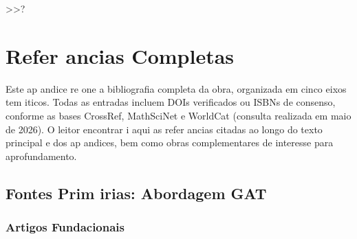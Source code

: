  >>?\chapter{Refer ancias Completas}
\label{apx:referencias}

Este ap andice re one a bibliografia completa da obra, organizada em cinco eixos tem iticos. Todas as entradas incluem DOIs verificados ou ISBNs de consenso, conforme as bases CrossRef, MathSciNet e WorldCat (consulta realizada em maio de 2026). O leitor encontrar i aqui as refer ancias citadas ao longo do texto principal e dos ap andices, bem como obras complementares de interesse para aprofundamento.

\section{Fontes Prim irias: Abordagem GAT}
\label{sec:ref_primarias}

\subsection{Artigos Fundacionais}

